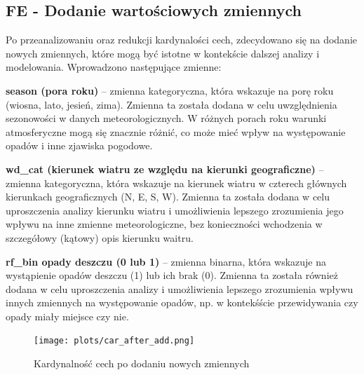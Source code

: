 \documentclass[10pt,a4paper]{article}
\begin{document}
\vspace{1.5em} 
\subsection*{FE - Dodanie wartościowych zmiennych}
Po przeanalizowaniu oraz redukcji kardynalości cech, zdecydowano się na dodanie nowych zmiennych, które mogą być istotne w kontekście dalszej analizy i modelowania. Wprowadzono następujące zmienne:
\par
\hspace{0.75cm}
\textbf{season (pora roku)} – zmienna kategoryczna, która wskazuje na porę roku (wiosna, lato, jesień, zima). Zmienna ta została dodana w celu uwzględnienia sezonowości w danych meteorologicznych. W różnych porach roku warunki atmosferyczne mogą się znacznie różnić, co może mieć wpływ na występowanie opadów i inne zjawiska pogodowe.
\par
\hspace{0.75cm}
\textbf{wd\_cat (kierunek wiatru ze względu na kierunki geograficzne)} – zmienna kategoryczna, która wskazuje na kierunek wiatru w czterech głównych kierunkach geograficznych (N, E, S, W). Zmienna ta została dodana w celu uproszczenia analizy kierunku wiatru i umożliwienia lepszego zrozumienia jego wpływu na inne zmienne meteorologiczne, bez konieczności wchodzenia w szczegółowy (kątowy) opis kierunku waitru.
\par
\hspace{0.75cm}
\textbf{rf\_bin {opady deszczu (0 lub 1)}} – zmienna binarna, która wskazuje na wystąpienie opadów deszczu (1) lub ich brak (0). Zmienna ta została również dodana w celu uproszczenia analizy i umożliwienia lepszego zrozumienia wpływu innych zmiennych na występowanie opadów, np. w kontekśście przewidywania czy opady miały miejsce czy nie.
\begin{figure}[H]
	\centering
	\texttt{[image: plots/car\_after\_add.png]}
	\caption{Kardynalność cech po dodaniu nowych zmiennych}
	\label{fig:my_label}
\end{figure}




\vspace{1.5em} 
\end{document}

